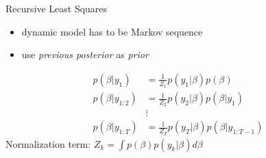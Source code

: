 \documentclass[navbarinfooter, 12pt]{sdqbeamer}
\begin{document}
%          
%
%          
%
%          


  \begin{frame}{Recursive Least Squares}
  \begin{itemize}
    \item dynamic model has to be Markov sequence
    \item  use \textit{previous posterior} as \textit{prior}
  \end{itemize}
  \begin{align*}
      p(\beta | y_{1}) &= \frac{1}{Z_1} p(y_1 | \beta) p(\beta) \\
      p(\beta | y_{1:2}) &= \frac{1}{Z_2} p(y_2 | \beta) p(\beta | y_1) \\
                        &\vdots \\
    p(\beta | y_{1:T}) &= \frac{1}{Z_T} p(y_T | \beta) p(\beta | y_{1:T-1})
  \end{align*}
  Normalization term: $Z_k = \int p(\beta) p(y_k | \beta) d\beta$
\end{frame}

\backupend
\end{document}
